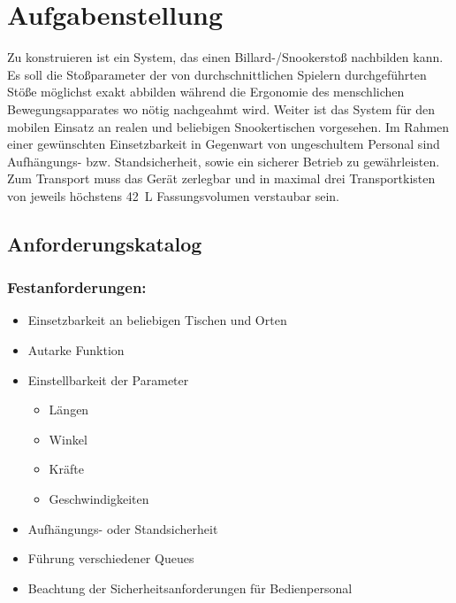 \chapter{Aufgabenstellung}

	Zu konstruieren ist ein System, das einen Billard-/Snookerstoß nachbilden kann.
	Es soll die Stoßparameter der von durchschnittlichen Spielern durchgeführten Stöße möglichst exakt abbilden während die Ergonomie des menschlichen Bewegungsapparates wo nötig nachgeahmt wird.
	Weiter ist das System für den mobilen Einsatz an realen und beliebigen Snookertischen vorgesehen. Im Rahmen einer gewünschten Einsetzbarkeit in Gegenwart von ungeschultem Personal sind Aufhängungs- bzw. Standsicherheit, sowie ein sicherer Betrieb zu gewährleisten.
	Zum Transport muss das Gerät zerlegbar und in maximal drei Transportkisten von jeweils höchstens \SI{42}{L} Fassungsvolumen verstaubar sein.

\section{Anforderungskatalog}

\subsection{Festanforderungen:}

\begin{itemize}
	\item Einsetzbarkeit an beliebigen Tischen und Orten
	\item Autarke Funktion
	\item Einstellbarkeit der Parameter
	\begin{itemize}
		\item Längen
		\item Winkel
		\item Kräfte
		\item Geschwindigkeiten
	\end{itemize}
	\item Aufhängungs- oder Standsicherheit
	\item Führung verschiedener Queues
	\item Beachtung der Sicherheitsanforderungen für Bedienpersonal
\end{itemize}

